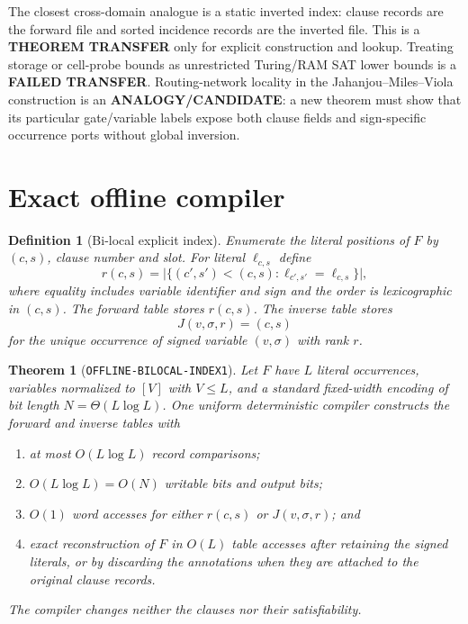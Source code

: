 \documentclass[11pt]{article}
\newtheorem{theorem}{Theorem}
\newtheorem{definition}{Definition}
\begin{document}
The closest cross-domain analogue is a static inverted index: clause
records are the forward file and sorted incidence records are the inverted
file.  This is a \textbf{THEOREM TRANSFER} only for explicit construction and
lookup.  Treating storage or cell-probe bounds as unrestricted Turing/RAM SAT
lower bounds is a \textbf{FAILED TRANSFER}.  Routing-network locality in the
Jahanjou--Miles--Viola construction is an \textbf{ANALOGY/CANDIDATE}: a new
theorem must show that its particular gate/variable labels expose both
clause fields and sign-specific occurrence ports without global inversion.

\section{Exact offline compiler}

\begin{definition}[Bi-local explicit index]
Enumerate the literal positions of $F$ by $(c,s)$, clause number and slot.
For literal $\ell_{c,s}$ define
\[
 r(c,s)=\bigl|\{(c',s')<(c,s):
    \ell_{c',s'}=\ell_{c,s}\}\bigr|,
\]
where equality includes variable identifier and sign and the order is
lexicographic in $(c,s)$.  The forward table stores $r(c,s)$.  The inverse
table stores
\[
 J(v,\sigma,r)=(c,s)
\]
for the unique occurrence of signed variable $(v,\sigma)$ with rank $r$.
\end{definition}

\begin{theorem}[\texttt{OFFLINE-BILOCAL-INDEX1}]
Let $F$ have $L$ literal occurrences, variables normalized to $[V]$ with
$V\le L$, and a standard fixed-width encoding of bit length
$N=\Theta(L\log L)$.  One uniform deterministic compiler constructs the
forward and inverse tables with
\begin{enumerate}[nosep]
\item at most $O(L\log L)$ record comparisons;
\item $O(L\log L)=O(N)$ writable bits and output bits;
\item $O(1)$ word accesses for either $r(c,s)$ or $J(v,\sigma,r)$; and
\item exact reconstruction of $F$ in $O(L)$ table accesses after retaining
the signed literals, or by discarding the annotations when they are attached
to the original clause records.
\end{enumerate}
The compiler changes neither the clauses nor their satisfiability.
\end{theorem}
\end{document}
